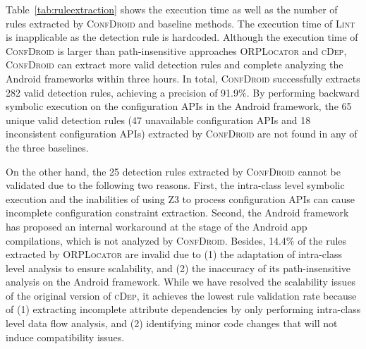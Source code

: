 \begin{comment}
	\begin{figure}[t]
	\centering
	\texttt{[image: ./img/issue-distribution.pdf]}
	\caption{Valid issue-detection rules generated by \textsc{ConfDroid} and the other two baselines. \civi{Make the font in the Figure larger}}
	\label{fig:issuedistribution}
	\end{figure}
\end{comment}

Table~\ref{tab:ruleextraction} shows the execution time as well as the number
of rules
extracted by \textsc{ConfDroid} and baseline methods.
The execution time of \textsc{Lint} is inapplicable as the detection rule is
hardcoded.
Although the execution time of \textsc{ConfDroid} is larger than
path-insensitive approaches \textsc{ORPLocator} and \textsc{cDep},
\textsc{ConfDroid} can extract more valid detection rules and complete
analyzing the Android frameworks within three hours.
In total, \textsc{ConfDroid} successfully extracts 282 valid detection rules,
achieving a precision of 91.9\%.
By performing backward symbolic execution on the configuration APIs in the
Android framework, 
the 65 unique valid detection rules (47 unavailable configuration
APIs and 18 inconsistent configuration APIs) extracted by \textsc{ConfDroid}
are not found in any of the three baselines.

On the other hand, the 25 detection rules extracted by \textsc{ConfDroid} cannot be validated due to the following two reasons.
First, the intra-class level symbolic execution and the inabilities of using Z3 to process configuration APIs can cause incomplete configuration constraint extraction.
Second, the Android framework has proposed an internal workaround at the stage of the Android app compilations,
which is not analyzed by \textsc{ConfDroid}.
Besides, 14.4\% of the rules extracted by \textsc{ORPLocator} are invalid due to
(1) the adaptation of intra-class level analysis to ensure scalability, and (2) the inaccuracy of its path-insensitive analysis on the Android framework.
While we have resolved the scalability issues of the original version of
\textsc{cDep}, it achieves the lowest rule validation rate because of
(1) extracting incomplete attribute dependencies by only performing intra-class
level data flow analysis, and (2) identifying minor code changes that will not
induce compatibility issues.

